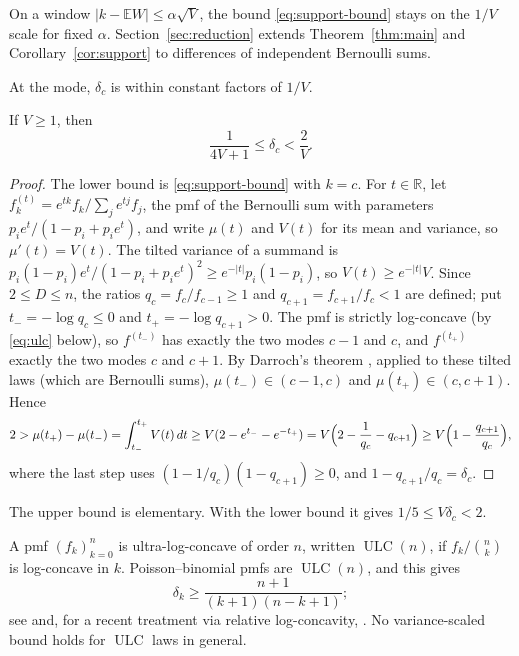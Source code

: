 \documentclass[ECP,preprint]{ejpecp}
\begin{document}
On a window $|k-\mathbb EW|\leq\alpha\sqrt V$, the bound
\eqref{eq:support-bound} stays on the $1/V$ scale for fixed $\alpha$.
Section~\ref{sec:reduction} extends Theorem~\ref{thm:main} and
Corollary~\ref{cor:support} to differences of independent Bernoulli sums.

At the mode, $\delta_c$ is within constant factors of $1/V$.

\begin{proposition}\label{prop:mode}
  If $V\geq1$, then
  \[
    \frac1{4V+1}\leq\delta_c<\frac2V.
  \]
\end{proposition}

\begin{proof}
  The lower bound is \eqref{eq:support-bound} with $k=c$. For
  $t\in\mathbb R$, let $f^{(t)}_k=e^{tk}f_k/\sum_je^{tj}f_j$, the pmf of the Bernoulli sum
  with parameters $p_ie^t/(1-p_i+p_ie^t)$, and write $\mu(t)$ and $V(t)$ for
  its mean and variance, so $\mu'(t)=V(t)$. The tilted variance of a summand
  is $p_i(1-p_i)e^t/(1-p_i+p_ie^t)^2\geq e^{-|t|}p_i(1-p_i)$, so
  $V(t)\geq e^{-|t|}V$. Since $2\leq D\leq n$, the ratios $q_c=f_c/f_{c-1}\geq1$
  and $q_{c+1}=f_{c+1}/f_c<1$ are defined; put $t_-=-\log q_c\leq0$ and
  $t_+=-\log q_{c+1}>0$. The pmf is strictly log-concave (by \eqref{eq:ulc}
  below), so $f^{(t_-)}$ has exactly the two modes $c-1$ and $c$, and
  $f^{(t_+)}$ exactly the two modes $c$ and $c+1$. By Darroch's theorem
  \cite{darroch1964}, applied to these tilted laws (which are Bernoulli sums),
  $\mu(t_-)\in(c-1,c)$ and $\mu(t_+)\in(c,c+1)$. Hence
  \[
    2>\mu(t_+)-\mu(t_-)=\int_{t_-}^{t_+}V(t)\,dt\geq V(2-e^{t_-}-e^{-t_+})
    =V\Bigl(2-\frac1{q_c}-q_{c+1}\Bigr)\geq V\Bigl(1-\frac{q_{c+1}}{q_c}\Bigr),
  \]
  where the last step uses $(1-1/q_c)(1-q_{c+1})\geq0$, and
  $1-q_{c+1}/q_c=\delta_c$.
\end{proof}

The upper bound is elementary. With the lower bound it gives
$1/5\leq V\delta_c<2$.

A pmf $(f_k)_{k=0}^n$ is ultra-log-concave of order $n$, written
$\operatorname{ULC}(n)$, if $f_k/\binom nk$ is log-concave in $k$.
Poisson--binomial pmfs are $\operatorname{ULC}(n)$, and this gives
\begin{equation}\label{eq:ulc}
  \delta_k\geq
  \frac{n+1}{(k+1)(n-k+1)};
\end{equation}
see \cite[Definition~3.11 and equation~(41)]{hillionjohnson2016} and, for a
recent treatment via relative log-concavity,
\cite[the discussion following Definition~1.3]{marsigliettimelbourne2026}.
No variance-scaled bound holds for $\operatorname{ULC}$ laws in general.
\end{document}
